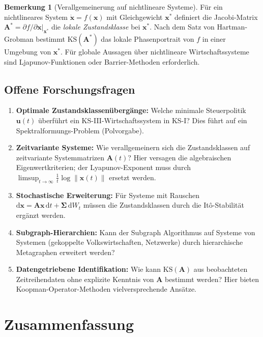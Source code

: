 \documentclass[a4paper, 12pt, twoside, openright]{report}
\theoremstyle{definition}
\newtheorem{remark}[theorem]{Bemerkung}
\theoremstyle{definition}
\newcommand{\vx}{\bm{x}}
\newcommand{\vu}{\bm{u}}
\newcommand{\vA}{\bm{A}}
\newcommand{\KS}{\mathrm{KS}}
\begin{document}
\begin{remark}[Verallgemeinerung auf nichtlineare Systeme]
Für ein nichtlineares System $\dot{\vx} = f(\vx)$ mit Gleichgewicht $\vx^*$ definiert
die Jacobi-Matrix $\vA^* = \partial f/\partial\vx\big|_{\vx^*}$ die
\emph{lokale Zustandsklasse} bei $\vx^*$. Nach dem Satz von Hartman-Grobman
bestimmt $\KS(\vA^*)$ das lokale Phasenportrait von $f$ in einer Umgebung von $\vx^*$.
Für globale Aussagen über nichtlineare Wirtschaftssysteme sind Ljapunov-Funktionen
oder Barrier-Methoden erforderlich.
\end{remark}

\subsection{Offene Forschungsfragen}

\begin{enumerate}[label=\textbf{F\arabic*.}]
  \item \textbf{Optimale Zustandsklassenübergänge:} Welche minimale Steuerpolitik
    $\vu(t)$ überführt ein KS-III-Wirtschaftssystem in KS-I? Dies führt auf ein
    Spektralformungs-Problem (Polvorgabe).

  \item \textbf{Zeitvariante Systeme:} Wie verallgemeinern sich die Zustandsklassen auf
    zeitvariante Systemmatrizen $\vA(t)$? Hier versagen die algebraischen Eigenwertkriterien;
    der Lyapunov-Exponent muss durch $\limsup_{t\to\infty} \frac{1}{t}\log\|\vx(t)\|$ ersetzt werden.

  \item \textbf{Stochastische Erweiterung:} Für Systeme mit Rauschen
    $\mathrm{d}\vx = \vA\vx\,\mathrm{d}t + \bm{\Sigma}\,\mathrm{d}W_t$ müssen
    die Zustandsklassen durch die Itô-Stabilität ergänzt werden.

  \item \textbf{Subgraph-Hierarchien:} Kann der Subgraph Algorithmus auf Systeme von
    Systemen (gekoppelte Volkswirtschaften, Netzwerke) durch hierarchische Metagraphen
    erweitert werden?

  \item \textbf{Datengetriebene Identifikation:} Wie kann $\KS(\vA)$ aus beobachteten
    Zeitreihendaten ohne explizite Kenntnis von $\vA$ bestimmt werden? Hier bieten
    Koopman-Operator-Methoden vielversprechende Ansätze.
\end{enumerate}

\section{Zusammenfassung}
\label{sec:schluss}
\end{document}

